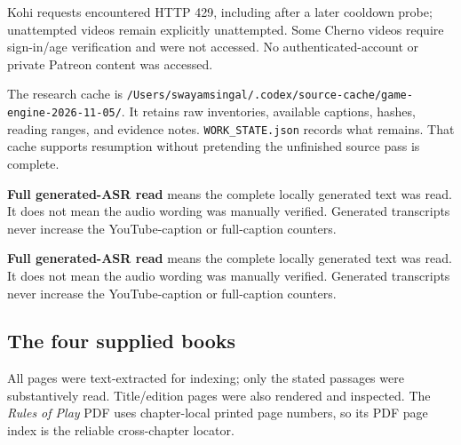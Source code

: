 Kohi requests encountered HTTP 429, including after a later cooldown probe; unattempted videos remain explicitly unattempted. Some Cherno videos require sign-in/age verification and were not accessed. No authenticated-account or private Patreon content was accessed.

The research cache is \texttt{/Users/swayamsingal/.codex/source-cache/game-engine-2026-11-05/}. It retains raw inventories, available captions, hashes, reading ranges, and evidence notes. \texttt{WORK\_STATE.json} records what remains. That cache supports resumption without pretending the unfinished source pass is complete.

\textbf{Full generated-ASR read} means the complete locally generated text was read. It does not mean the audio wording was manually verified. Generated transcripts never increase the YouTube-caption or full-caption counters.

\textbf{Full generated-ASR read} means the complete locally generated text was read. It does not mean the audio wording was manually verified. Generated transcripts never increase the YouTube-caption or full-caption counters.

\subsection{The four supplied books}\label{appendix-877738f6f4d2-the-four-supplied-books}

All pages were text-extracted for indexing; only the stated passages were substantively read. Title/edition pages were also rendered and inspected. The \emph{Rules of Play} PDF uses chapter-local printed page numbers, so its PDF page index is the reliable cross-chapter locator.

